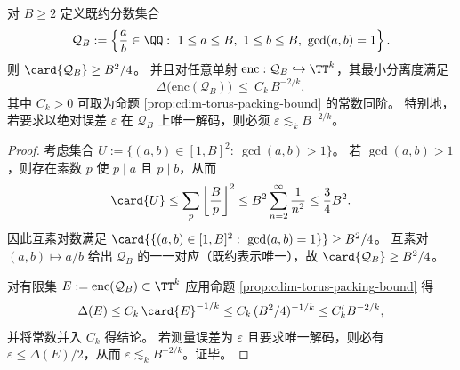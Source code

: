 \begin{proposition}[有界高度有理点的相位分离屏障]\label{prop:cdim-bounded-height-rationals-separation}
对 \(B\ge 2\) 定义既约分数集合
\[
\mathcal Q_B:=\left\{\frac{a}{b}\in\QQ:\ 1\le a\le B,\ 1\le b\le B,\ \gcd(a,b)=1\right\}.
\]
则 \(\card{\mathcal Q_B}\ge B^2/4\)。
并且对任意单射 \(\mathrm{enc}:\mathcal Q_B\hookrightarrow\TT^k\)，其最小分离度满足
\[
\Delta\bigl(\mathrm{enc}(\mathcal Q_B)\bigr)\ \le\ C_k\,B^{-2/k},
\]
其中 \(C_k>0\) 可取为命题 \ref{prop:cdim-torus-packing-bound} 的常数同阶。
特别地，若要求以绝对误差 \(\varepsilon\) 在 \(\mathcal Q_B\) 上唯一解码，则必须 \(\varepsilon\lesssim_k B^{-2/k}\)。
\end{proposition}
\begin{proof}
考虑集合
\(
U:=\{(a,b)\in[1,B]^2:\ \gcd(a,b)>1\}
\)。
若 \(\gcd(a,b)>1\)，则存在素数 \(p\) 使 \(p\mid a\) 且 \(p\mid b\)，从而
\[
\card{U}
\le
\sum_{p}\left\lfloor\frac{B}{p}\right\rfloor^2
\le
B^2\sum_{n=2}^{\infty}\frac{1}{n^2}
\le
\frac{3}{4}B^2.
\]
因此互素对数满足
\(
\card{\{(a,b)\in[1,B]^2:\ \gcd(a,b)=1\}}\ge B^2/4
\)。
互素对 \((a,b)\mapsto a/b\) 给出 \(\mathcal Q_B\) 的一一对应（既约表示唯一），故 \(\card{\mathcal Q_B}\ge B^2/4\)。
\par
对有限集 \(E:=\mathrm{enc}(\mathcal Q_B)\subset\TT^k\) 应用命题 \ref{prop:cdim-torus-packing-bound} 得
\[
\Delta(E)\le C_k\,\card{E}^{-1/k}\le C_k\,(B^2/4)^{-1/k}\le C_k' B^{-2/k},
\]
并将常数并入 \(C_k\) 得结论。
若测量误差为 \(\varepsilon\) 且要求唯一解码，则必有 \(\varepsilon\le \Delta(E)/2\)，从而 \(\varepsilon\lesssim_k B^{-2/k}\)。证毕。
\end{proof}

\endinput
